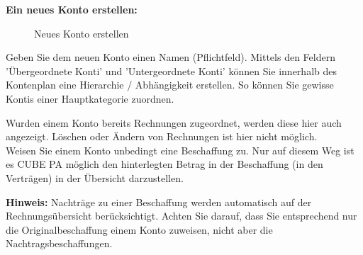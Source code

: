\vspace{\baselineskip}

\pagebreak
\textbf{Ein neues Konto erstellen:} 

\begin{figure}[H]
\caption{Neues Konto erstellen}
\end{figure}

Geben Sie dem neuen Konto einen Namen (Pflichtfeld). Mittels den Feldern 'Übergeordnete Konti' und 'Untergeordnete Konti' können Sie innerhalb des Kontenplan eine Hierarchie / Abhängigkeit erstellen. So können Sie gewisse Kontis einer Hauptkategorie zuordnen.

\vspace{\baselineskip}

Wurden einem Konto bereits Rechnungen zugeordnet, werden diese hier auch angezeigt. Löschen oder Ändern von Rechnungen ist hier nicht möglich.\\
Weisen Sie einem Konto unbedingt eine Beschaffung zu. Nur auf diesem Weg ist es CUBE PA möglich den hinterlegten Betrag in der Beschaffung (in den Verträgen) in der Übersicht darzustellen.

\vspace{\baselineskip}

\textbf{Hinweis:} Nachträge zu einer Beschaffung werden automatisch auf der Rechnungsübersicht berücksichtigt. Achten Sie darauf, dass Sie entsprechend nur die Originalbeschaffung einem Konto zuweisen, nicht aber die Nachtragsbeschaffungen.

\vspace{\baselineskip}

